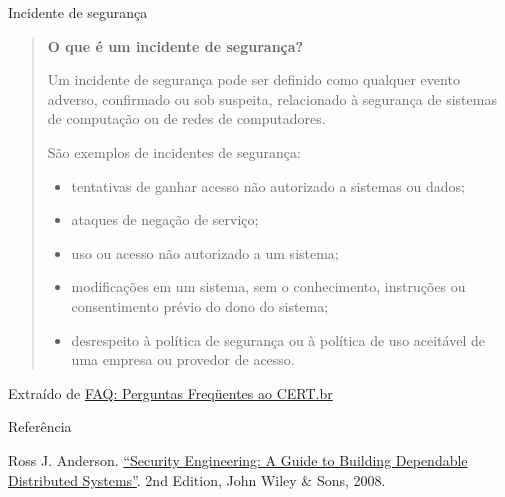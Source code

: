 \begin{frame}{Incidente de segurança}

\begin{quote}\footnotesize
{\bf O que é um incidente de segurança?}

Um incidente de segurança pode ser definido como qualquer evento
adverso, confirmado ou sob suspeita, relacionado à segurança de
sistemas de computação ou de redes de computadores.

São exemplos de incidentes de segurança:

\begin{itemize}[<+-| alert@+>]
\item tentativas de ganhar acesso não autorizado a sistemas ou dados;
\item ataques de negação de serviço;
\item uso ou acesso não autorizado a um sistema;
\item modificações em um sistema, sem o conhecimento, instruções ou consentimento prévio do dono do sistema;
\item desrespeito à política de segurança ou à política de uso aceitável de uma empresa ou provedor de acesso.
\end{itemize}

\end{quote}

\hfill Extraído de \href{http://www.cert.br/docs/certbr-faq.html\#6}{FAQ: Perguntas Freqüentes ao CERT.br}

\end{frame}

\begin{frame}[allowframebreaks]{Referência}

  \begin{thebibliography}{10}
    \beamertemplatebookbibitems
    Ross J. Anderson.
    \newblock \href{https://www.amazon.com.br/Security-Engineering-Building-Dependable-Distributed/dp/0470068523}{``Security Engineering: A Guide to Building
      Dependable Distributed Systems''}.
    \newblock 2nd Edition, John Wiley \& Sons, 2008.

  \end{thebibliography}

\end{frame}
